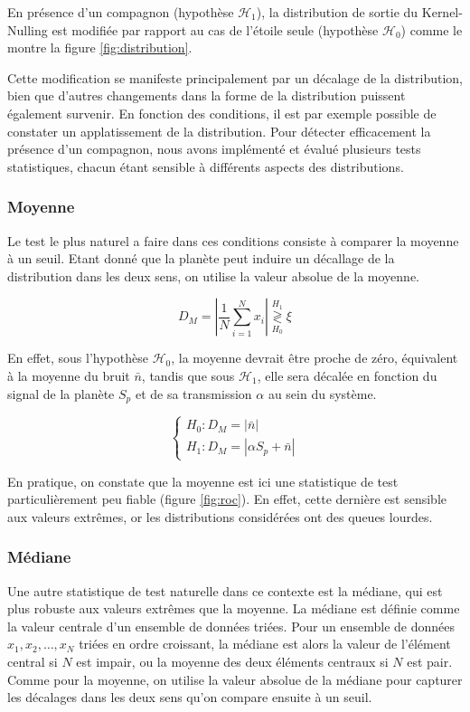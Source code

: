 \documentclass{article}
\begin{document}
En présence d'un compagnon (hypothèse $\mathcal{H}_1$), la distribution de sortie du Kernel-Nulling est modifiée par rapport au cas de l'étoile seule (hypothèse $\mathcal{H}_0$) comme le montre la figure \ref{fig:distribution}.

Cette modification se manifeste principalement par un décalage de la distribution, bien que d'autres changements dans la forme de la distribution puissent également survenir. En fonction des conditions, il est par exemple possible de constater un applatissement de la distribution. Pour détecter efficacement la présence d'un compagnon, nous avons implémenté et évalué plusieurs tests statistiques, chacun étant sensible à différents aspects des distributions.

\subsubsection{Moyenne}

Le test le plus naturel a faire dans ces conditions consiste à comparer la moyenne à un seuil. Etant donné que la planète peut induire un décallage de la distribution dans les deux sens, on utilise la valeur absolue de la moyenne.

$$
D_{M} = \left|\frac{1}{N}\sum_{i=1}^N x_i \right| \stackrel{H_1}{\underset{H_0}{\gtrless}} \xi
$$

En effet, sous l'hypothèse $\mathcal{H}_0$, la moyenne devrait être proche de zéro, équivalent à la moyenne du bruit $\bar{n}$, tandis que sous $\mathcal{H}_1$, elle sera décalée en fonction du signal de la planète $S_p$ et de sa transmission $\alpha$ au sein du système.

$$
\begin{cases}
H_0 : D_M = |\bar{n}|\\
H_1 : D_M =  |\alpha S_p + \bar{n}|
\end{cases}
$$

En pratique, on constate que la moyenne est ici une statistique de test particulièrement peu fiable (figure \ref{fig:roc}). En effet, cette dernière est sensible aux valeurs extrêmes, or les distributions considérées ont des queues lourdes.

\subsubsection{Médiane}
Une autre statistique de test naturelle dans ce contexte est la médiane, qui est plus robuste aux valeurs extrêmes que la moyenne. La médiane est définie comme la valeur centrale d'un ensemble de données triées. Pour un ensemble de données $x_1, x_2, \ldots, x_N$ triées en ordre croissant, la médiane est alors la valeur de l'élément central si $N$ est impair, ou la moyenne des deux éléments centraux si $N$ est pair. Comme pour la moyenne, on utilise la valeur absolue de la médiane pour capturer les décalages dans les deux sens qu'on compare ensuite à un seuil.
\end{document}
